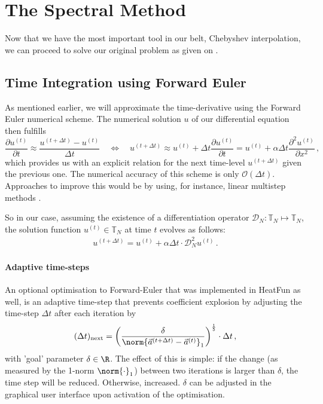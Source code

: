 \documentclass[12pt, a4paper]{article}
\newcommand{\chebyshev}{Chebyshev\xspace}
\newcommand{\heatfun}{\textcolor{themecolor3}{HeatFun}\xspace}
\begin{document}

  \section{The Spectral Method}
  Now that we have the most important tool in our belt, \chebyshev interpolation, we can proceed to solve our original problem as given on .

  \subsection{Time Integration using Forward Euler}
  As mentioned earlier, we will approximate the time-derivative using the Forward Euler numerical scheme.
  The numerical solution $u$ of our differential equation then fulfills
  $$\frac{\partial u^{(t)}}{\partial t} \approx \frac{u^{(t+\Delta t)} - u^{(t)}}{\Delta t} \quad\Leftrightarrow\quad u^{(t+\Delta t)} \approx u^{(t)} + \Delta t \frac{\partial u^{(t)}}{\partial t} = u^{(t)} + \alpha \Delta t \frac{\partial^2 u^{(t)}}{\partial x^2} \,,$$
  which provides us with an explicit relation for the next time-level $u^{(t+\Delta t)}$ given the previous one.
  The numerical accuracy of this scheme is only $\mathcal{O}(\Delta t)$.
  Approaches to improve this would be by using, for instance, linear multistep methods \parencite{süli_mayers_2003}.

  So in our case, assuming the existence of a differentiation operator $\mathcal{D}_N: \mathbb{T}_N \mapsto \mathbb{T}_N$, the solution function $u^{(t)} \in \mathbb{T}_N$ at time $t$ evolves as follows:
  \begin{align*}
    u^{(t+\Delta t)} = u^{(t)} + \alpha \Delta t \cdot \mathcal{D}_N^2 u^{(t)} \,.
  \end{align*}

  \paragraph{Adaptive time-steps}
  An optional optimisation to Forward-Euler that was implemented in \heatfun as well, is an adaptive time-step that prevents coefficient explosion by adjusting the time-step $\Delta t$ after each iteration by
  $$(\Delta t)_{\text{next}} = \left(\frac{\delta}{\norm{\vec{a}^{(t+\Delta t)} - \vec{a}^{(t)}}_1}\right)^{\frac{1}{5}} \cdot \Delta t \,,$$
  with 'goal' parameter $\delta \in \R$.
  The effect of this is simple: if the change (as measured by the 1-norm $\norm{\cdot}_1$) between two iterations is larger than $\delta$, the time step will be reduced. Otherwise, increased.
  $\delta$ can be adjusted in the graphical user interface upon activation of the optimisation.
\end{document}
